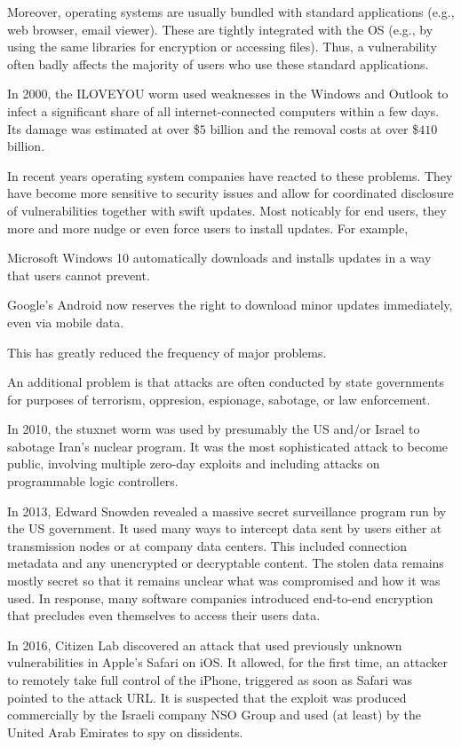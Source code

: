 Moreover, operating systems are usually bundled with standard applications (e.g., web browser, email viewer).
These are tightly integrated with the OS (e.g., by using the same libraries for encryption or accessing files).
Thus, a vulnerability often badly affects the majority of users who use these standard applications.

In 2000, the ILOVEYOU worm used weaknesses in the Windows and Outlook to infect a significant share of all internet-connected computers within a few days.
Its damage was estimated at over \$$5$ billion and the removal costs at over \$$410$ billion.

In recent years operating system companies have reacted to these problems.
They have become more sensitive to security issues and allow for coordinated disclosure of vulnerabilities together with swift updates.
Most noticably for end users, they more and more nudge or even force users to install updates.
For example,
\begin{compactitem}
\item Microsoft Windows 10 automatically downloads and installs updates in a way that users cannot prevent.
\item Google's Android now reserves the right to download minor updates immediately, even via mobile data.
\end{compactitem}
This has greatly reduced the frequency of major problems.

An additional problem is that attacks are often conducted by state governments for purposes of terrorism, oppresion, espionage, sabotage, or law enforcement.

In 2010, the stuxnet worm was used by presumably the US and/or Israel to sabotage Iran's nuclear program.
It was the most sophisticated attack to become public, involving multiple zero-day exploits and including attacks on programmable logic controllers.

In 2013, Edward Snowden revealed a massive secret surveillance program run by the US government.
It used many ways to intercept data sent by users either at transmission nodes or at company data centers.
This included connection metadata and any unencrypted or decryptable content.
The stolen data remains mostly secret so that it remains unclear what was compromised and how it was used.
In response, many software companies introduced end-to-end encryption that precludes even themselves to access their users data.

In 2016, Citizen Lab discovered an attack that used previously unknown vulnerabilities in Apple's Safari on iOS.
It allowed, for the first time, an attacker to remotely take full control of the iPhone, triggered as soon as Safari was pointed to the attack URL.
It is suspected that the exploit was produced commercially by the Israeli company NSO Group and used (at least) by the United Arab Emirates to spy on dissidents.

